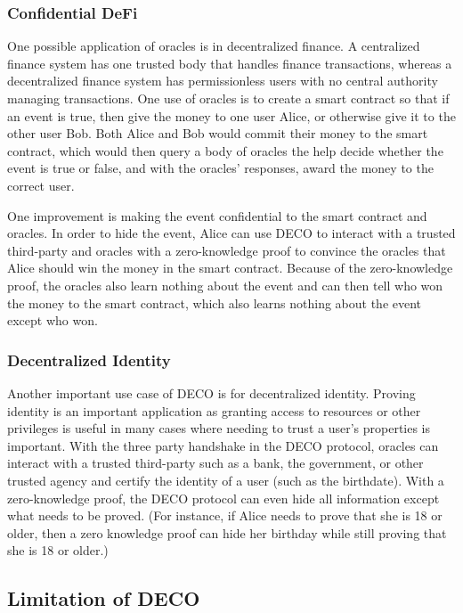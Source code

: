 \documentclass[twoside]{article}
\begin{document}
	\subsubsection{Confidential DeFi}
	One possible application of oracles is in decentralized finance. A centralized finance system has one trusted body that handles finance transactions, whereas a decentralized finance system has permissionless users with no central authority managing transactions. One use of oracles is to create a smart contract so that if an event is true, then give the money to one user Alice, or otherwise give it to the other user Bob. Both Alice and Bob would commit their money to the smart contract, which would then query a body of oracles the help decide whether the event is true or false, and with the oracles' responses, award the money to the correct user.
	
	One improvement is making the event confidential to the smart contract and oracles. In order to hide the event, Alice can use DECO to interact with a trusted third-party and oracles with a zero-knowledge proof to convince the oracles that Alice should win the money in the smart contract. Because of the zero-knowledge proof, the oracles also learn nothing about the event and can then tell who won the money to the smart contract, which also learns nothing about the event except who won.
	
	
	\subsubsection{Decentralized Identity}
	Another important use case of DECO is for decentralized identity. Proving identity is an important application as granting access to resources or other privileges is useful in many cases where needing to trust a user's properties is important. With the three party handshake in the DECO protocol, oracles can interact with a trusted third-party such as a bank, the government, or other trusted agency and certify the identity of a user (such as the birthdate). With a zero-knowledge proof, the DECO protocol can even hide all information except what needs to be proved. (For instance, if Alice needs to prove that she is 18 or older, then a zero knowledge proof can hide her birthday while still proving that she is 18 or older.)
	
	
	\subsection{Limitation of DECO}
	
\end{document}
